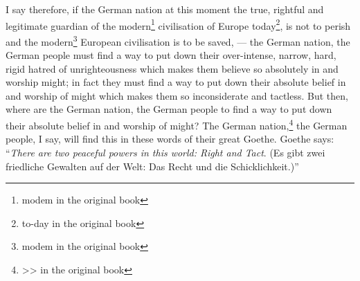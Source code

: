 I say therefore, if the German nation at this moment the true, rightful and legitimate guardian of the modern\footnote{modem in the original book} civilisation of Europe today\footnote{to-day in the original book}, is not to perish and the modern\footnote{modem in the original book} European civilisation is to be saved, --- the German nation, the German people must find a way to put down their over-intense, narrow, hard, rigid hatred of unrighteousness which makes them believe so absolutely in and worship might; in fact they must find a way to put down their absolute belief in and worship of might which makes them so inconsiderate and tactless.
But then, where are the German nation, the German people to find a way to put down their absolute belief in and worship of might?
The German nation,\footnote{>> in the original book} the German people, I say, will find this in these words of their great Goethe.
Goethe says: ``\emph{There are two peaceful powers in this world: Right and Tact}. (Es gibt zwei friedliche Gewalten auf der Welt: Das Recht und die Schicklichkeit.)'' 

